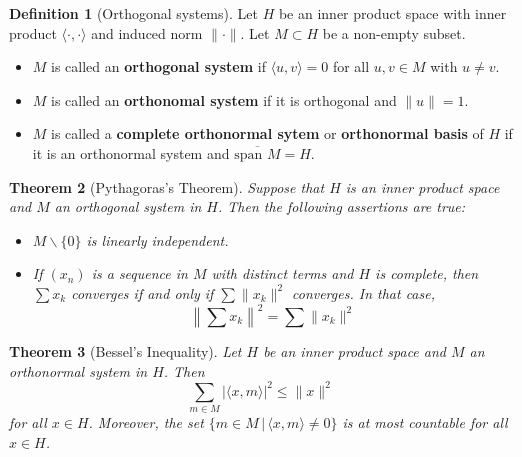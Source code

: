 \documentclass[10pt, oneside, reqno]{amsart}
\theoremstyle{plain}%
\newtheorem{thm}{Theorem}[section]
\theoremstyle{definition}
\newtheorem{defn}[thm]{Definition}
\theoremstyle{remark}
\newcommand{\iprod}[2]{\langle #1, #2 \rangle}
\newcommand{\ol}[1]{\overline{#1}}
\begin{document}
\begin{defn}[Orthogonal systems]  
    Let $H$ be an inner product space with inner product $\iprod{\cdot}{\cdot}$ and induced norm $\| \cdot \|$.  Let $M \subset H$ be a non-empty subset.
    \begin{itemize}
        \item $M$ is called an \textbf{orthogonal system} if $\iprod{u}{v} = 0$ for all $u,v \in M$ with $u \neq v$.
        \item $M$ is called an \textbf{orthonomal system} if it is orthogonal and $\| u \| = 1$.
        \item $M$ is called a \textbf{complete orthonormal sytem} or \textbf{orthonormal basis} of $H$ if it is an orthonormal system and $\ol{\text{span $M$}} = H$.
    \end{itemize}

\end{defn}

\begin{thm}[Pythagoras's Theorem]
    Suppose that $H$ is an inner product space and $M$ an orthogonal system in $H$.  Then the following assertions are true:
    \begin{itemize}
        \item $M \backslash \{0\}$ is linearly independent.
        \item If $(x_n)$ is a sequence in $M$ with distinct terms and $H$ is complete, then $\sum x_k$ converges if and only if $\sum \| x_k \|^2$ converges.  In that case, \[
            \left\| \sum x_k \right\|^2 = \sum \|x_k \|^2
        \]
    \end{itemize}
\end{thm}

\begin{thm}[Bessel's Inequality]
    Let $H$ be an inner product space and $M$ an orthonormal system in $H$.  Then \[
        \sum_{m \in M} | \iprod{x}{m}|^2 \leq \| x \|^2
    \]
    for all $x \in H$.  Moreover, the set $\{ m \in M \, | \, \iprod{x}{m} \neq 0 \}$ is at most countable for all $x \in H$.
\end{thm}

\end{document}
